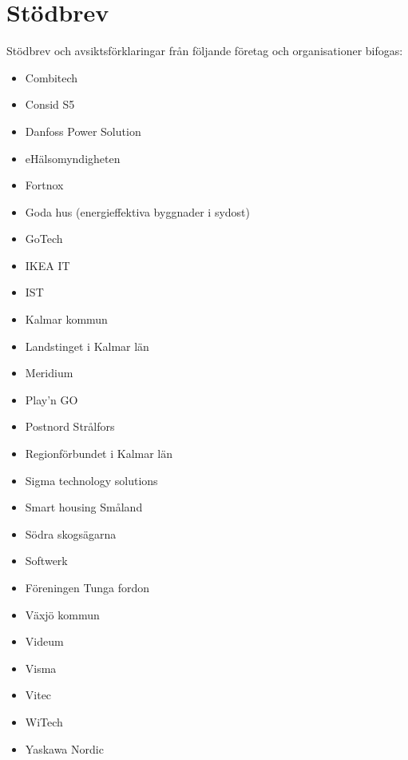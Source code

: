 \chapter{Stödbrev\label{app:stodbrev}}

Stödbrev och avsiktsförklaringar från följande företag och organisationer bifogas:

\begin{itemize}
\tightlist
	\item Combitech
	\item Consid S5
	\item Danfoss Power Solution
	\item eHälsomyndigheten
	\item Fortnox
	\item Goda hus (energieffektiva byggnader i sydost)
    \item GoTech
	\item IKEA IT
	\item IST
	\item Kalmar kommun
	\item Landstinget i Kalmar län
	\item Meridium
	\item Play'n GO
	\item Postnord Strålfors
	\item Regionförbundet i Kalmar län
	\item Sigma technology solutions
	\item Smart housing Småland
	\item Södra skogsägarna
	\item Softwerk
	\item Föreningen Tunga fordon
	\item Växjö kommun
	\item Videum
	\item Visma
	\item Vitec
	\item WiTech
	\item Yaskawa Nordic
\end{itemize}

\pagebreak

